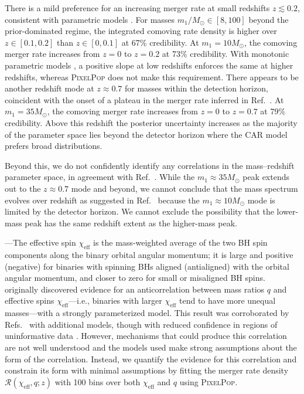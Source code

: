 \begin{refsection}
There is a mild preference for an increasing merger rate at small redshifts $z \lesssim 0.2$, consistent with parametric models \cite{Fishbach:2018edt, Callister:2020arv, KAGRA:2021duu, Schiebelbein-Zwack:2024roj}. For masses $m_1 / M_\odot \in [8,100]$ beyond the prior-dominated regime, the integrated comoving rate density is higher over $z \in [0.1,0.2]$ than $z \in [0,0.1]$ at 67\% credibility. At $m_1 = 10M_\odot$, the comoving merger rate increases from $z=0$ to $z=0.2$ at 73\% credibility. With monotonic parametric models \cite{KAGRA:2021duu, Fishbach:2018edt}, a positive slope at low redshifts enforces the same at higher redshifts, whereas \textsc{PixelPop} does not make this requirement. There appears to be another redshift mode at $z\approx0.7$ for masses within the detection horizon, coincident with the onset of a plateau in the merger rate inferred in Ref.~\cite{Callister:2023tgi}. At $m_1 = 35M_\odot$, the comoving merger rate increases from $z=0$ to $z=0.7$ at 79\% credibility. Above this redshift the posterior uncertainty increases as the majority of the parameter space lies beyond the detector horizon where the CAR model prefers broad distributions.

Beyond this, we do not confidently identify any correlations in the mass--redshift parameter space, in agreement with Ref.~\cite{Ray:2023upk,Sadiq:2021fin}. While the $m_1 \approx 35 M_\odot$ peak extends out to the $z \approx 0.7$ mode and beyond, we cannot conclude that the mass spectrum evolves over redshift as suggested in Ref.~\cite{Rinaldi:2023bbd} because the $m_1 \approx 10 M_\odot$ mode is limited by the detector horizon. We cannot exclude the possibility that the lower-mass peak has the same redshift extent as the higher-mass peak.

---The effective spin $\chi_\mathrm{eff}$ is the mass-weighted average of the two BH spin components along the binary orbital angular momentum; it is large and positive (negative) for binaries with spinning BHs aligned (antialigned) with the orbital angular momentum, and closer to zero for small or misaligned BH spins. \citeauthor{Callister:2021fpo}~\cite{Callister:2021fpo} originally discovered evidence for an anticorrelation between mass ratios $q$ and effective spins $\chi_\mathrm{eff}$---i.e., binaries with larger $\chi_\mathrm{eff}$ tend to have more unequal masses---with a strongly parameterized model. This result was corroborated by Refs.~\cite{Adamcewicz:2022hce, Adamcewicz:2023mov, Heinzel:2023hlb, KAGRA:2021duu} with additional models, though with reduced confidence in regions of uninformative data \cite{Heinzel:2023hlb}. However, mechanisms that could produce this correlation are not well understood \cite{Broekgaarden:2022nst, Bavera:2020uch, Zevin:2022wrw, Gerosa:2021mno, McKernan:2021nwk, Santini:2023ukl, Baibhav:2022qxm, Santini:2023ukl, Olejak:2021iux, Olejak:2024qxr} and the models used make strong assumptions about the form of the correlation. Instead, we quantify the evidence for this correlation and constrain its form with minimal assumptions by fitting the merger rate density $\mathcal{R}(\chi_\mathrm{eff},q;z)$ with 100 bins over both $\chi_\mathrm{eff}$ and $q$ using \textsc{PixelPop}.


\end{refsection}

